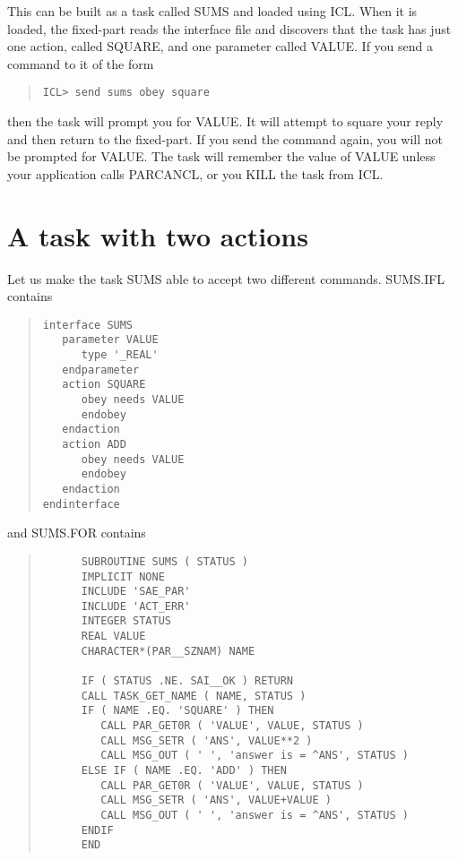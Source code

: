 \documentclass[twoside,11pt]{article}
\newcommand{\xlabel}[1]{}
\renewcommand{\_}{\texttt{\symbol{95}}}
\begin{document}
This can be built as a task called SUMS and loaded using ICL. When it is 
loaded, the fixed-part reads the interface file and discovers that the 
task has just one action, called SQUARE, and one parameter called VALUE. 
If you send a command to it of the form

\small \begin{quote} \begin{verbatim}
ICL> send sums obey square
\end{verbatim} \end{quote} \normalsize

then the task will prompt you for VALUE. It will attempt to square your 
reply and then return to the fixed-part. If you send the command again,
you will not be prompted for VALUE. The task will remember the value of
VALUE unless your application calls PAR\_CANCL, or you KILL the task
from ICL. 

\section{A task with two actions\xlabel{a_task_with_two_actions}}

Let us make the task SUMS able to accept two different commands.
SUMS.IFL contains 

\small \begin{quote} \begin{verbatim}
interface SUMS
   parameter VALUE
      type '_REAL'
   endparameter
   action SQUARE
      obey needs VALUE
      endobey
   endaction
   action ADD
      obey needs VALUE
      endobey
   endaction
endinterface
\end{verbatim} \end{quote} \normalsize

and SUMS.FOR contains

\small \begin{quote} \begin{verbatim}
      SUBROUTINE SUMS ( STATUS )
      IMPLICIT NONE
      INCLUDE 'SAE_PAR'
      INCLUDE 'ACT_ERR'
      INTEGER STATUS
      REAL VALUE
      CHARACTER*(PAR__SZNAM) NAME

      IF ( STATUS .NE. SAI__OK ) RETURN
      CALL TASK_GET_NAME ( NAME, STATUS )
      IF ( NAME .EQ. 'SQUARE' ) THEN
         CALL PAR_GET0R ( 'VALUE', VALUE, STATUS )
         CALL MSG_SETR ( 'ANS', VALUE**2 )
         CALL MSG_OUT ( ' ', 'answer is = ^ANS', STATUS )
      ELSE IF ( NAME .EQ. 'ADD' ) THEN
         CALL PAR_GET0R ( 'VALUE', VALUE, STATUS )
         CALL MSG_SETR ( 'ANS', VALUE+VALUE )
         CALL MSG_OUT ( ' ', 'answer is = ^ANS', STATUS )
      ENDIF
      END
\end{verbatim} \end{quote} \normalsize
\end{document}
